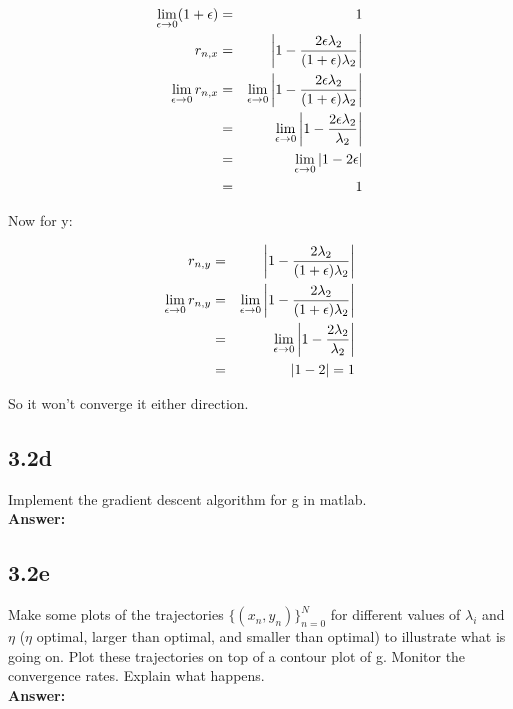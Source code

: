 \documentclass[a4paper]{article}
\begin{document}
\begin{eqnarray}
\lim_{\epsilon \rightarrow 0} (1+\epsilon) &=& 1\\
r_{n,x} &=& \abs{1 - \frac{2\epsilon \lambda_2}{(1 + \epsilon) \lambda_2}}\\
\lim_{ \epsilon\rightarrow 0} r_{n,x} &=& \lim_{ \epsilon\rightarrow 0} \abs{1 - \frac{2\epsilon \lambda_2}{(1 + \epsilon) \lambda_2}}\\
&=& \lim_{ \epsilon\rightarrow 0} \abs{1 - \frac{2 \epsilon\lambda_2}{\lambda_2}}\\
&=& \lim_{ \epsilon\rightarrow 0} \abs{1 - 2\epsilon}\\
&=& 1
\end{eqnarray}

Now for y:

\begin{eqnarray}
r_{n,y} &=& \abs{ 1- \frac{2\lambda_2}{(1+\epsilon) \lambda_2}}\\
\lim_{ \epsilon\rightarrow 0} r_{n,y} &=& \lim_{ \epsilon\rightarrow 0} \abs{ 1- \frac{2\lambda_2}{(1+\epsilon) \lambda_2}}\\
&=& \lim_{ \epsilon\rightarrow 0} \abs{ 1- \frac{2\lambda_2}{ \lambda_2}}\\
&=& \abs{1 - 2} = 1
\end{eqnarray}

So it won't converge it either direction. 

\subsection*{3.2d}

Implement the gradient descent algorithm for g in matlab.\\

\textbf{Answer:}\\


\subsection*{3.2e}

Make some plots of the trajectories $\{(x_n,y_n)\}^N_{n=0}$ for different values of $\lambda_i$ and $\eta$ ($\eta$ optimal, larger than optimal, and smaller than optimal) to illustrate what is going on. Plot these trajectories on top of a contour plot of g. Monitor the convergence rates. Explain what happens.\\

\textbf{Answer:}\\
\end{document}
